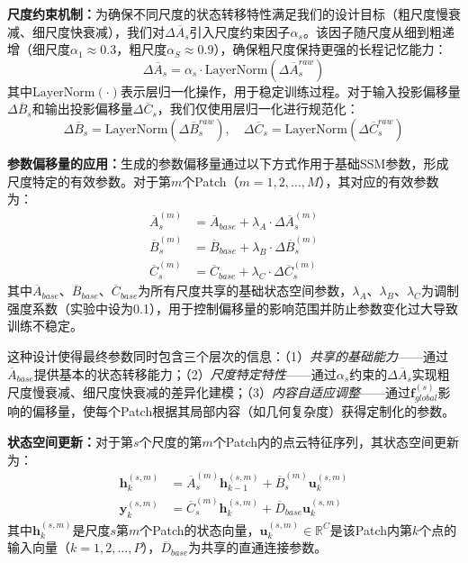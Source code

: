 \documentclass[preprint,12pt]{elsarticle}
\begin{document}
\textbf{尺度约束机制：}为确保不同尺度的状态转移特性满足我们的设计目标（粗尺度慢衰减、细尺度快衰减），我们对$\Delta\overline{A}_s$引入尺度约束因子$\alpha_s$。该因子随尺度从细到粗递增（细尺度$\alpha_1 \approx 0.3$，粗尺度$\alpha_S \approx 0.9$），确保粗尺度保持更强的长程记忆能力：
\begin{equation}
	\Delta\overline{A}_s = \alpha_s \cdot \text{LayerNorm}(\Delta\overline{A}_s^{raw})
\end{equation}
其中$\text{LayerNorm}(\cdot)$表示层归一化操作，用于稳定训练过程。对于输入投影偏移量$\Delta\overline{B}_s$和输出投影偏移量$\Delta\overline{C}_s$，我们仅使用层归一化进行规范化：
\begin{equation}
	\Delta\overline{B}_s = \text{LayerNorm}(\Delta\overline{B}_s^{raw}), \quad
	\Delta\overline{C}_s = \text{LayerNorm}(\Delta\overline{C}_s^{raw})
\end{equation}

\textbf{参数偏移量的应用：}生成的参数偏移量通过以下方式作用于基础SSM参数，形成尺度特定的有效参数。对于第$m$个Patch（$m = 1, 2, \ldots, M$），其对应的有效参数为：
\begin{equation}
	\begin{aligned}
		\overline{A}_s^{(m)} &= \overline{A}_{base} + \lambda_A \cdot \Delta\overline{A}_s^{(m)} \\
		\overline{B}_s^{(m)} &= \overline{B}_{base} + \lambda_B \cdot \Delta\overline{B}_s^{(m)} \\
		\overline{C}_s^{(m)} &= \overline{C}_{base} + \lambda_C \cdot \Delta\overline{C}_s^{(m)}
	\end{aligned}
	\label{eq:param_modulation}
\end{equation}
其中$\overline{A}_{base}$、$\overline{B}_{base}$、$\overline{C}_{base}$为所有尺度共享的基础状态空间参数，$\lambda_A$、$\lambda_B$、$\lambda_C$为调制强度系数（实验中设为0.1），用于控制偏移量的影响范围并防止参数变化过大导致训练不稳定。

这种设计使得最终参数同时包含三个层次的信息：（1）\textit{共享的基础能力}——通过$\overline{A}_{base}$提供基本的状态转移能力；（2）\textit{尺度特定特性}——通过$\alpha_s$约束的$\Delta\overline{A}_s$实现粗尺度慢衰减、细尺度快衰减的差异化建模；（3）\textit{内容自适应调整}——通过$\mathbf{f}_{global}^{(s)}$影响的偏移量，使每个Patch根据其局部内容（如几何复杂度）获得定制化的参数。

\textbf{状态空间更新：}对于第$s$个尺度的第$m$个Patch内的点云特征序列，其状态空间更新为：
\begin{equation}
	\begin{aligned}
		\mathbf{h}_k^{(s,m)} &= \overline{A}_s^{(m)} \mathbf{h}_{k-1}^{(s,m)} + \overline{B}_s^{(m)} \mathbf{u}_k^{(s,m)} \\
		\mathbf{y}_k^{(s,m)} &= \overline{C}_s^{(m)} \mathbf{h}_k^{(s,m)} + \overline{D}_{base} \mathbf{u}_k^{(s,m)}
	\end{aligned}
	\label{eq:asd_ssm_update}
\end{equation}
其中$\mathbf{h}_k^{(s,m)}$是尺度$s$第$m$个Patch的状态向量，$\mathbf{u}_k^{(s,m)} \in \mathbb{R}^C$是该Patch内第$k$个点的输入向量（$k=1,2,\ldots,P$），$\overline{D}_{base}$为共享的直通连接参数。
\end{document}
